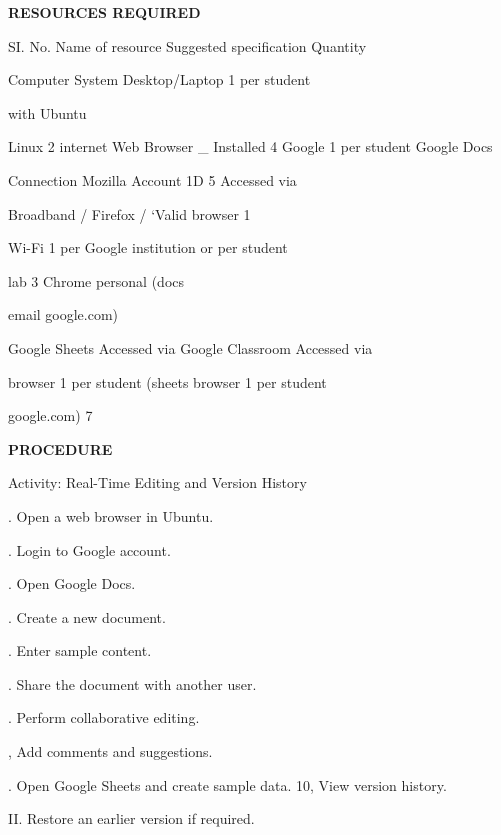 \documentclass[10pt,a4paper]{article}
\begin{document}
\medskip\noindent\textbf{RESOURCES REQUIRED}\par
\noindent SI. No. Name of resource Suggested specification Quantity\par

                                      Computer System Desktop/Laptop       1 per student\par
\noindent with Ubuntu\par

\noindent Linux 2         internet        Web Browser      \_ Installed 4   Google           1 per student   Google Docs\par
\noindent Connection      Mozilla                          Account          1D 5            Accessed via\par
\noindent Broadband /     Firefox /                        ‘Valid                           browser 1\par
\noindent Wi-Fi 1 per     Google                           institution or                   per student\par
\noindent lab 3           Chrome                           personal                         (docs\par
\noindent email                            google.com)\par

                                      Google Sheets Accessed via           Google Classroom Accessed via\par
\noindent browser 1 per student (sheets        browser 1 per student\par
\noindent google.com) 7\par

\medskip\noindent\textbf{PROCEDURE}\par
\noindent Activity: Real-Time Editing and Version History\par
{}. Open a web browser in Ubuntu.\par
{}. Login to Google account.\par
{}. Open Google Docs.\par
{}. Create a new document.\par
{}. Enter sample content.\par
{}. Share the document with another user.\par
\clearpage
{}. Perform collaborative editing.\par
{}, Add comments and suggestions.\par
{}. Open Google Sheets and create sample data. 10, View version history.\par
\noindent II. Restore an earlier version if required.\par
\end{document}
